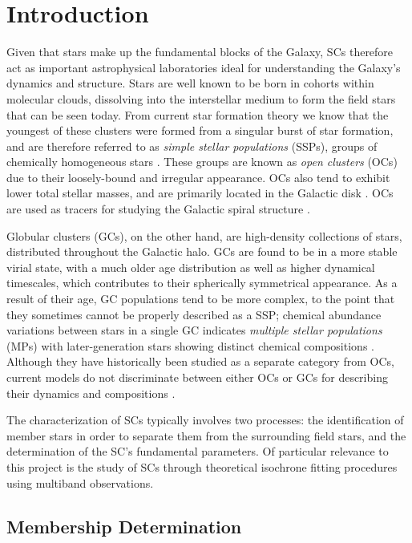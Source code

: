 \section{Introduction}
Given that stars make up the fundamental blocks of the Galaxy, SCs therefore act as important astrophysical laboratories ideal for understanding the Galaxy's dynamics and structure. Stars are well known to be born in cohorts within molecular clouds, dissolving into the interstellar medium to form the field stars that can be seen today. From current star formation theory we know that the youngest of these clusters were formed from a singular burst of star formation, and are therefore referred to as \textit{simple stellar populations} (SSPs), groups of chemically homogeneous stars \autocite{huangDrivingFactorsMultiple2024}. These groups are known as \textit{open clusters} (OCs) due to their loosely-bound and irregular appearance. OCs also tend to exhibit lower total stellar masses, and are primarily located in the Galactic disk \autocite{zwartYoungMassiveStar2010a}. OCs are used as tracers for studying the Galactic spiral structure \autocite{dias58OpenClusters2022}.

Globular clusters (GCs), on the other hand, are high-density collections of stars, distributed throughout the Galactic halo. GCs are found to be in a more stable virial state, with a much older age distribution as well as higher dynamical timescales, which contributes to their spherically symmetrical appearance. As a result of their age, GC populations tend to be more complex, to the point that they sometimes cannot be properly described as a SSP; chemical abundance variations between stars in a single GC indicates \textit{multiple stellar populations} (MPs) with later-generation stars showing distinct chemical compositions \autocite{huangDrivingFactorsMultiple2024}. Although they have historically been studied as a separate category from OCs, current models do not discriminate between either OCs or GCs for describing their dynamics and compositions \autocite{krumholzStarClustersCosmic2019}.

The characterization of SCs typically involves two processes: the identification of member stars in order to separate them from the surrounding field stars, and the determination of the SC's fundamental parameters. Of particular relevance to this project is the study of SCs through theoretical isochrone fitting procedures using multiband observations.

\subsection{Membership Determination}

